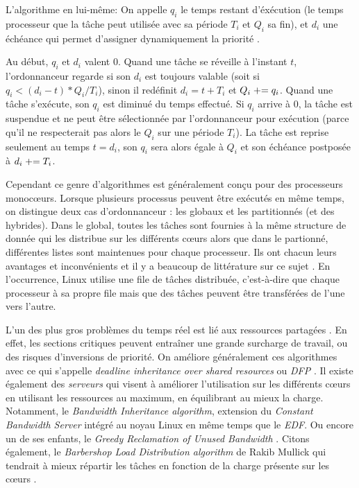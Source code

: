 \documentclass[letterpaper]{article}
\begin{document}
L'algorithme en lui-même:
On appelle \textit{$q_i$} le temps restant d'éxécution (le temps processeur que la tâche peut utilisée avec sa période \textit{$T_i$} et \textit{$Q_i$} sa fin), et \textit{$d_i$} une échéance qui permet d'assigner dynamiquement la priorité \citep{LelliEDFLinux}.

Au début, \textit{$q_i$} et \textit{$d_i$} valent 0.
Quand une tâche se réveille à l'instant $t$, l'ordonnanceur regarde si son $d_i$ est toujours valable (soit si $q_i < (d_i - t) * Q_i/ T_i$), sinon il redéfinit $d_i = t + T_i$ et $Q_i \mathrel{+}= q_i$. Quand une tâche s'exécute, son $q_i$ est diminué du temps effectué. Si $q_i$ arrive à 0, la tâche est suspendue et ne peut être sélectionnée par l'ordonnanceur pour exécution (parce qu'il ne respecterait pas alors le $Q_i$ sur une période $T_i$). La tâche est reprise seulement au temps $t = d_i$, son $q_i$ sera alors égale à $Q_i$ et son échéance postposée à $d_i \mathrel{+}= T_i$.

Cependant ce genre d'algorithmes est généralement conçu pour des processeurs monocœurs. Lorsque plusieurs processus peuvent être exécutés en même temps, on distingue deux cas d'ordonnanceur \citep{faggioli2009implementation}: les globaux et les partitionnés (et des hybrides). Dans le global, toutes les tâches sont fournies à la même structure de donnée qui les distribue sur les différents cœurs alors que dans le partionné, différentes listes sont maintenues pour chaque processeur. Ils ont chacun leurs avantages et inconvénients et il y a beaucoup de littérature sur ce sujet \citep{bastoni2010empirical, lelli2012experimental}.
En l'occurrence, Linux utilise une file de tâches distribuée, c'est-à-dire que chaque processeur à sa propre file mais que des tâches peuvent être transférées de l'une vers l'autre.

L'un des plus gros problèmes du temps réel est lié aux ressources partagées \citep{buttazzo2011hard}. En effet, les sections critiques peuvent entraîner une grande surcharge de travail, ou des risques d'inversions de priorité. On améliore généralement ces algorithmes avec ce qui s'appelle \textit{deadline inheritance over shared resources} ou \textit{DFP} \citep{jansen2003lightweight}. Il existe également des \textit{serveurs} qui visent à améliorer l'utilisation sur les différents cœurs en utilisant les ressources au maximum, en équilibrant au mieux la charge. Notamment, le \textit{Bandwidth Inheritance algorithm}, extension du \textit{Constant Bandwidth Server} \citep{Abeni:1998:IMA:827270.829047} intégré au noyau Linux en même temps que le \textit{EDF}. Ou encore un de ses enfants, le \textit{Greedy Reclamation of Unused Bandwidth} \citep{Lipari:2000:GRU:1947412.1947445}. Citons également, le \textit{Barbershop Load
Distribution algorithm} de Rakib Mullick qui tendrait à mieux répartir les tâches en fonction de la charge présente sur les cœurs \citep{BarbershopLoadDistribution}.
\end{document}
